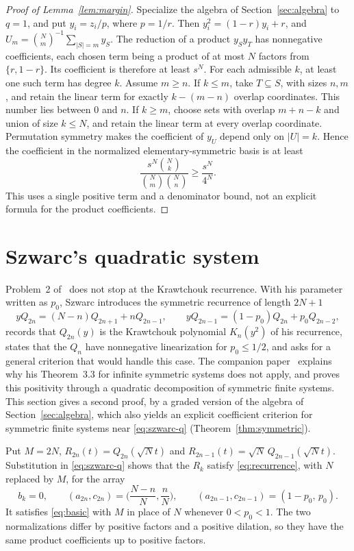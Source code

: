 \begin{proof}[Proof of Lemma~\ref{lem:margin}]
Specialize the algebra of Section~\ref{sec:algebra} to $q=1$, and put $y_i=z_i/p$, where $p=1/r$. Then $y_i^2=(1-r)y_i+r$, and $U_m=\binom Nm^{-1}\sum_{|S|=m}y_S$. The reduction of a product $y_Sy_T$ has nonnegative coefficients, each chosen term being a product of at most $N$ factors from $\{r,1-r\}$. Its coefficient is therefore at least $s^N$.
For each admissible $k$, at least one such term has degree $k$. Assume $m\geq n$. If $k\leq m$, take $T\subseteq S$, with sizes $n,m$, and retain the linear term for exactly $k-(m-n)$ overlap coordinates. This number lies between $0$ and $n$. If $k\geq m$, choose sets with overlap $m+n-k$ and union of size $k\leq N$, and retain the linear term at every overlap coordinate.
Permutation symmetry makes the coefficient of $y_U$ depend only on $|U|=k$. Hence the coefficient in the normalized elementary-symmetric basis is at least
\[
\frac{s^N\binom Nk}{\binom Nm\binom Nn}\geq\frac{s^N}{4^N}.
\]
This uses a single positive term and a denominator bound, not an explicit formula for the product coefficients.
\end{proof}

\section{Szwarc's quadratic system}\label{sec:szwarc}

Problem~2 of~\cite[\S5]{szwarc} does not stop at the Krawtchouk recurrence. With his parameter written as $p_0$, Szwarc introduces the symmetric recurrence of length $2N+1$
\begin{equation}\label{eq:szwarc-q}
yQ_{2n}=(N-n)Q_{2n+1}+nQ_{2n-1},\qquad
yQ_{2n-1}=(1-p_0)Q_{2n}+p_0Q_{2n-2},
\end{equation}
records that $Q_{2n}(y)$ is the Krawtchouk polynomial $K_n(y^2)$ of his recurrence, states that the $Q_n$ have nonnegative linearization for $p_0\leq1/2$, and asks for a general criterion that would handle this case. The companion paper~\cite[Section~]{P1} explains why his Theorem~3.3 for infinite symmetric systems does not apply, and proves this positivity through a quadratic decomposition of symmetric finite systems. This section gives a second proof, by a graded version of the algebra of Section~\ref{sec:algebra}, which also yields an explicit coefficient criterion for symmetric finite systems near \eqref{eq:szwarc-q} (Theorem~\ref{thm:symmetric}).

Put $M=2N$, $R_{2n}(t)=Q_{2n}(\sqrt Nt)$ and $R_{2n-1}(t)=\sqrt N\,Q_{2n-1}(\sqrt Nt)$. Substitution in \eqref{eq:szwarc-q} shows that the $R_k$ satisfy \eqref{eq:recurrence}, with $N$ replaced by $M$, for the array
\begin{equation}\label{eq:qarray}
b_k=0,\qquad
(a_{2n},c_{2n})=\Big(\frac{N-n}{N},\frac nN\Big),\qquad
(a_{2n-1},c_{2n-1})=(1-p_0,\,p_0).
\end{equation}
It satisfies \eqref{eq:basic} with $M$ in place of $N$ whenever $0<p_0<1$. The two normalizations differ by positive factors and a positive dilation, so they have the same product coefficients up to positive factors.

